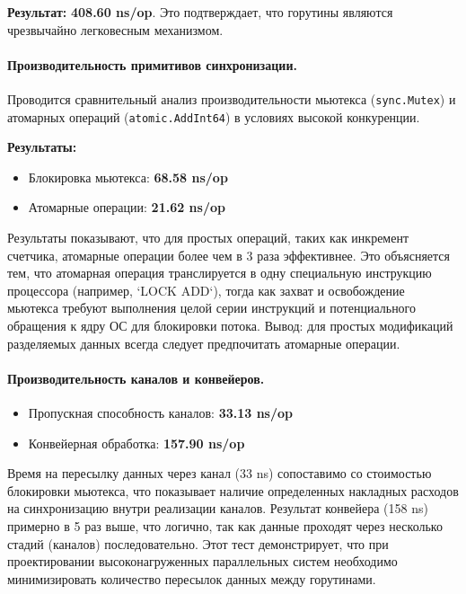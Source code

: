 \textbf{Результат:} \textbf{408.60 ns/op}. Это подтверждает, что горутины являются чрезвычайно легковесным механизмом.

\paragraph{Производительность примитивов синхронизации.} Проводится сравнительный анализ производительности мьютекса (\texttt{sync.Mutex}) и атомарных операций (\texttt{atomic.AddInt64}) в условиях высокой конкуренции.

\textbf{Результаты:}
\begin{itemize}
    \item Блокировка мьютекса: \textbf{68.58 ns/op}
    \item Атомарные операции: \textbf{21.62 ns/op}
\end{itemize}
Результаты показывают, что для простых операций, таких как инкремент счетчика, атомарные операции более чем в 3 раза эффективнее. Это объясняется тем, что атомарная операция транслируется в одну специальную инструкцию процессора (например, `LOCK ADD`), тогда как захват и освобождение мьютекса требуют выполнения целой серии инструкций и потенциального обращения к ядру ОС для блокировки потока. Вывод: для простых модификаций разделяемых данных всегда следует предпочитать атомарные операции.

\paragraph{Производительность каналов и конвейеров.}
\begin{itemize}
    \item Пропускная способность каналов: \textbf{33.13 ns/op}
    \item Конвейерная обработка: \textbf{157.90 ns/op}
\end{itemize}
Время на пересылку данных через канал (33 ns) сопоставимо со стоимостью блокировки мьютекса, что показывает наличие определенных накладных расходов на синхронизацию внутри реализации каналов. Результат конвейера (158 ns) примерно в 5 раз выше, что логично, так как данные проходят через несколько стадий (каналов) последовательно. Этот тест демонстрирует, что при проектировании высоконагруженных параллельных систем необходимо минимизировать количество пересылок данных между горутинами.
